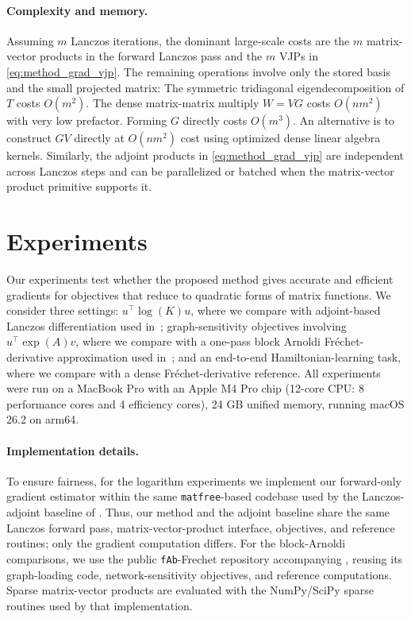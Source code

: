 \documentclass{article}
\begin{document}
\paragraph{Complexity and memory.}
Assuming $m$ Lanczos iterations, the dominant large-scale costs are the $m$ matrix-vector products in the forward
Lanczos pass and the $m$ VJPs in \eqref{eq:method_grad_vjp}. The remaining operations
involve only the stored basis and the small projected matrix: The symmetric tridiagonal
eigendecomposition of $T$ costs $O(m^2)$. The dense matrix-matrix multiply $W = VG$ costs $O(nm^2)$ with very low prefactor.
Forming $G$ directly costs $O(m^3)$.
An alternative is to construct $G V$ directly at $O(nm^2)$ cost using optimized dense linear algebra kernels.
Similarly, the adjoint products in \eqref{eq:method_grad_vjp} are independent across
Lanczos steps and can be parallelized or batched when the matrix-vector product
primitive supports it. 



\section{Experiments}
\label{sec:experiments}
Our experiments test whether the proposed method gives accurate and efficient
gradients for objectives that reduce to quadratic forms of matrix
functions. We consider three settings: $u^\top \log(K)u$, where we compare with
adjoint-based Lanczos differentiation used in~\cite{kramer2024gradients}; graph-sensitivity objectives involving
$u^\top \exp(A)v$, where we compare with a one-pass block Arnoldi
Fr\'echet-derivative approximation used in~\cite{kressner2026}; and an end-to-end Hamiltonian-learning task,
where we compare with a dense Fr\'echet-derivative reference. All experiments were run on a MacBook Pro with an Apple M4 Pro chip
(12-core CPU: 8 performance cores and 4 efficiency cores), 24 GB unified memory,
running macOS 26.2 on arm64.

\paragraph{Implementation details.}
To ensure fairness, for the logarithm experiments we implement our forward-only gradient
estimator within the same \texttt{matfree}-based codebase used by the Lanczos-adjoint
baseline of \citet{kramer2024gradients}. Thus, our method and the adjoint baseline share
the same Lanczos forward pass, matrix-vector-product interface, objectives, and reference
routines; only the gradient computation differs. For the block-Arnoldi comparisons, we
use the public \texttt{fAb}-Frechet repository accompanying \citet{kressner2026}, reusing
its graph-loading code, network-sensitivity objectives, and reference computations.
Sparse matrix-vector products are evaluated with the NumPy/SciPy sparse routines used
by that implementation.
\end{document}

